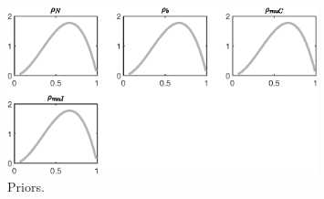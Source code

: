 \begin{figure}[H]
\centering
\includegraphics[width=0.80\textwidth]{BRS_sectoral_wo_gmf/graphs/BRS_sectoral_wo_gmf_Priors4}
\caption{Priors.}\label{Fig:Priors:4}
\end{figure}
 

